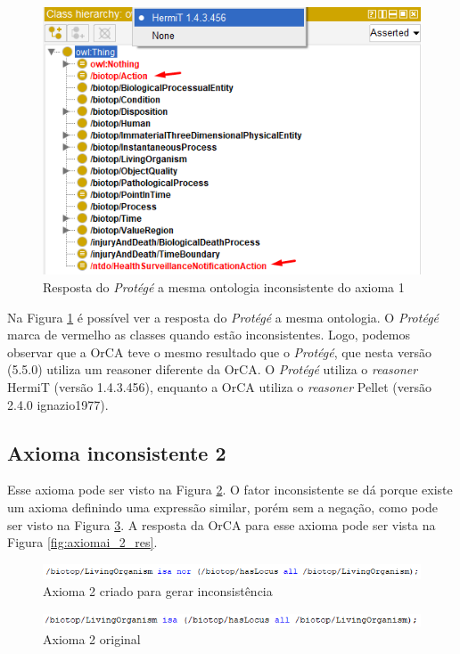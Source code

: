 \documentclass{bcc}
\begin{document}
\begin{figure}[H]
\centering
\includegraphics[width=.6\textwidth]{Figuras/axiomai_1_protege.png}
\caption{Resposta do \textit{Protégé} a mesma ontologia inconsistente do axioma 1} 
\label{fig:axiomai_1_protege}
\end{figure}

Na Figura \ref{fig:axiomai_1_protege} é possível ver a resposta do \textit{Protégé} a mesma ontologia. O \textit{Protégé} marca de vermelho as classes quando estão inconsistentes. Logo, podemos observar que a OrCA teve o mesmo resultado que o \textit{Protégé}, que nesta versão (5.5.0) utiliza um reasoner diferente da OrCA. O \textit{Protégé} utiliza o \textit{reasoner} HermiT (versão 1.4.3.456), enquanto a OrCA utiliza o \textit{reasoner} Pellet (versão 2.4.0 ignazio1977).


\subsection{Axioma inconsistente 2}
Esse axioma pode ser visto na Figura \ref{fig:axiomai_2}. O fator inconsistente se dá porque existe um axioma definindo uma expressão similar, porém sem a negação, como pode ser visto na Figura \ref{fig:axiomai_2_o}. A resposta da OrCA para esse axioma pode ser vista na Figura \ref{fig:axiomai_2_res}.

\begin{figure}[H]
\centering
\includegraphics[width=.9\textwidth]{Figuras/axiomai_2.png}
\caption{Axioma 2 criado para gerar inconsistência} 
\label{fig:axiomai_2}
\end{figure}

\begin{figure}[H]
\centering
\includegraphics[width=.9\textwidth]{Figuras/axiomai_2_o.png}
\caption{Axioma 2 original} 
\label{fig:axiomai_2_o}
\end{figure}
\end{document}
